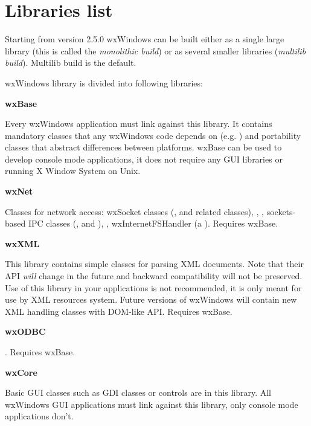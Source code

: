 \chapter{Libraries list}\label{librarieslist}
%
\setfooter{\thepage}{}{}{}{}{\thepage}%

Starting from version 2.5.0 wxWindows can be built either as a single large
library (this is called the {\it monolithic build}) or as several smaller
libraries ({\it multilib build}). Multilib build is the default.

wxWindows library is divided into following libraries:

{\large {\bf wxBase}}

Every wxWindows application must link against this library. It contains
mandatory classes that any wxWindows code depends on (e.g.
) and portability classes that abstract
differences between platforms. wxBase can be used to develop console mode
applications, it does not require any GUI libraries or running X Window System
on Unix.

{\large {\bf wxNet}}

Classes for network access:
wxSocket classes (,
 and related classes),
,
,
sockets-based IPC classes (,
 and
),
,
wxInternetFSHandler (a ).
Requires wxBase.

{\large {\bf wxXML}}

This library contains simple classes for parsing XML documents. Note that
their API {\em will} change in the future and backward
compatibility will not be preserved. Use of this library in your applications
is not recommended, it is only meant for use by XML resources system. Future
versions of wxWindows will contain new XML handling classes with DOM-like API.
Requires wxBase.

{\large {\bf wxODBC}}

. Requires wxBase.

{\large {\bf wxCore}}

Basic GUI classes such as GDI classes or controls are in this library. All
wxWindows GUI applications must link against this library, only console mode
applications don't.

